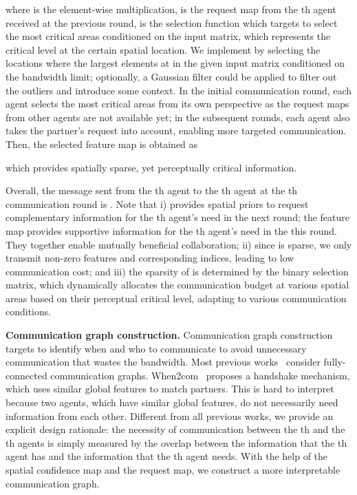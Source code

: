 \documentclass{article}
\begin{document}
where  is the element-wise multiplication,  is the request map from the th agent received at the previous round,  is the selection function which targets to select the most critical areas conditioned on the input matrix, which represents the critical level at the certain spatial location. We implement  by selecting the locations where the largest elements at in the given input matrix conditioned on the bandwidth limit; optionally, a Gaussian filter could be applied to filter out the outliers and introduce some context. In the initial communication round, each agent selects the most critical areas from its own perspective as the request maps from other agents are not available yet; in the subsequent rounds, each agent also takes the partner's request into account, enabling more targeted communication. Then, the selected feature map is obtained as

which provides spatially sparse, yet perceptually critical information. 

Overall, the message sent from the th agent to the th agent at the th communication round is . Note that i)  provides spatial priors to request complementary information for the th agent's need in the next round; the feature map  provides supportive information for the th agent's need in the this round. They together enable mutually beneficial collaboration; ii) since   is sparse, we only transmit non-zero features and corresponding indices, leading to low communication cost; and iii) the sparsity of  is determined by the binary selection matrix, which dynamically allocates the communication budget at various spatial areas based on their perceptual critical level, adapting to various communication conditions. 




\textbf{Communication graph construction.} Communication graph construction targets to identify when and who to communicate to avoid unnecessary communication that wastes the bandwidth. Most previous works~\cite{v2vnet,disconet,OPV2V} consider fully-connected communication graphs. When2com~\cite{when2com} proposes a handshake mechanism, which uses similar global features to match partners. This is hard to interpret because two agents, which have similar global features, do not necessarily need information from each other. Different from all previous works, we provide an explicit design rationale: the necessity of communication between the th and the th agents is simply measured by the overlap between the information that the th agent has and the information that the th agent needs. With the help of the spatial confidence map and the request map, we construct a more interpretable communication graph.
\end{document}
